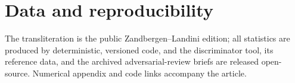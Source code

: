 \documentclass[11pt]{article}
\begin{document}
\section*{Data and reproducibility}
The transliteration is the public Zandbergen--Landini edition; all statistics are produced by
deterministic, versioned code, and the discriminator tool, its reference data, and the archived
adversarial-review briefs are released open-source. Numerical appendix and code links accompany the
article.



\end{document}
